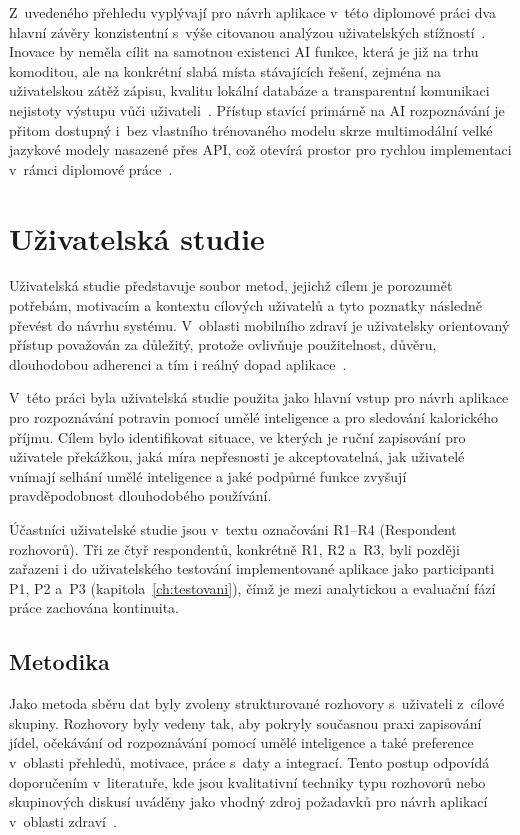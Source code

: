 Z~uvedeného přehledu vyplývají pro návrh aplikace v~této diplomové práci dva hlavní závěry konzistentní s~výše citovanou analýzou uživatelských stížností~\cite{zecevic2021userPerspectives}.
Inovace by neměla cílit na samotnou existenci AI funkce, která je již na trhu komoditou, ale na konkrétní slabá místa stávajících řešení, zejména na uživatelskou zátěž zápisu, kvalitu lokální databáze a transparentní komunikaci nejistoty výstupu vůči uživateli~\cite{li2024evaluating,zecevic2021userPerspectives}.
Přístup stavící primárně na AI rozpoznávání je přitom dostupný i~bez vlastního trénovaného modelu skrze multimodální velké jazykové modely nasazené přes API, což otevírá prostor pro rychlou implementaci v~rámci diplomové práce~\cite{wang2026visionLanguageFood}.

\section{Uživatelská studie}
\label{sec:uzivatelskaStudie}

Uživatelská studie představuje soubor metod, jejichž cílem je porozumět potřebám, motivacím a kontextu cílových uživatelů a tyto poznatky následně převést do návrhu systému.
V~oblasti mobilního zdraví je uživatelsky orientovaný přístup považován za důležitý, protože ovlivňuje použitelnost, důvěru, dlouhodobou adherenci a tím i reálný dopad aplikace~\cite{molina2020proposalUserCentered}.

V~této práci byla uživatelská studie použita jako hlavní vstup pro návrh aplikace pro rozpoznávání potravin pomocí umělé inteligence a pro sledování kalorického příjmu.
Cílem bylo identifikovat situace, ve kterých je ruční zapisování pro uživatele překážkou, jaká míra nepřesnosti je akceptovatelná, jak uživatelé vnímají selhání umělé inteligence a jaké podpůrné funkce zvyšují pravděpodobnost dlouhodobého používání.

Účastníci uživatelské studie jsou v~textu označováni R1--R4 (Respondent rozhovorů).
Tři ze čtyř respondentů, konkrétně R1, R2 a~R3, byli později zařazeni i do uživatelského testování implementované aplikace jako participanti P1, P2 a~P3 (kapitola~\ref{ch:testovani}), čímž je mezi analytickou a evaluační fází práce zachována kontinuita.

\subsection{Metodika}
\label{subsec:metodika}

Jako metoda sběru dat byly zvoleny strukturované rozhovory s~uživateli z~cílové skupiny.
Rozhovory byly vedeny tak, aby pokryly současnou praxi zapisování jídel, očekávání od rozpoznávání pomocí umělé inteligence a také preference v~oblasti přehledů, motivace, práce s~daty a integrací.
Tento postup odpovídá doporučením v~literatuře, kde jsou kvalitativní techniky typu rozhovorů nebo skupinových diskusí uváděny jako vhodný zdroj požadavků pro návrh aplikací v~oblasti zdraví~\cite{molina2020proposalUserCentered}.

